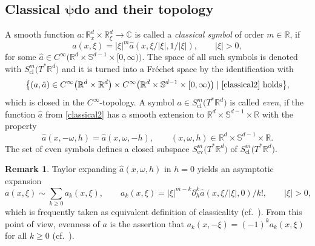 \documentclass[pdftex]{sigma}
\numberwithin{equation}{section}
\theoremstyle{definition}
\newtheorem{Remark}[Theorem]{Remark}
\newcommand{\R}{\mathbb{R}} %
\newcommand{\C}{\mathbb{C}} %
\newcommand{\ev}{\mathrm{ev}}
\newcommand{\1}{{\bf 1}}
\newcommand{\cl}{\mathrm{cl}}
\begin{document}
\subsection[Classical psido and their topology]{Classical $\boldsymbol{\psi}$do and their topology}
A smooth function $a\colon \R^d_x\times \R^d_\xi\rightarrow \C$ is called a {\it classical symbol} of order $m\in \R$, if
\begin{equation}\label{classical2}
	a(x,\xi)=|\xi|^m \hat a(x,\xi/|\xi|,1/|\xi|),\qquad |\xi|>0,
\end{equation}
for some $\hat a \in C^\infty\bigl(\R^d\times \mathbb S^{d-1}\times [0,\infty)\bigr)$. The space of all such symbols is denoted with $S_\cl^m\bigl(T^*\R^d\bigr)$ and it is turned into a Fr{\'e}chet space by the identification with
\[
	\big\{(a,\hat a)\in C^\infty\bigl(\R^d\times \R^d\bigr)\times C^\infty\bigl(\R^d\times \mathbb S^{d-1}\times [0,\infty)\bigr)\mid \text{\eqref{classical2} holds}\big\},
\]
which is closed in the $C^\infty$-topology. A symbol $a\in S^m_\cl\bigl(T^*\R^d\bigr)$ is called {\it even}, if the function $\hat a$ from \eqref{classical2} has a smooth extension to $\R^d\times \mathbb S^{d-1}\times \R$ with the property
\[
	\hat a(x,-\omega,h)= \hat a(x,\omega,-h),\qquad (x,\omega,h)\in \R^d\times \mathbb S^{d-1}\times \R.
\]
The set of even symbols defines a closed subspace $S^m_\ev\bigl(T^*\R^d\bigr)$ of $S^m_\cl\bigl(T^*\R^d\bigr)$.

\begin{Remark} Taylor expanding $\hat a(x,\omega,h)$ in $h=0$ yields an asymptotic expansion
\[
	a(x,\xi) \sim \sum_{k\ge 0} a_k(x,\xi),\qquad a_k(x,\xi)=|\xi|^{m-k} \partial_h^k\hat a(x,\xi/|\xi|,0)/k!,\qquad |\xi|>0,
\]
which is frequently taken as equivalent definition of classicality (cf.\ \cite{Shu01,Wun13}). From this point of view, evenness of $a$ is the assertion that $a_k(x,-\xi)=(-1)^{k} a_k(x,\xi)$ for all $k\ge 0$ (cf.~\cite[Definition 4.6]{MNP19a}).
\end{Remark}
\end{document}

